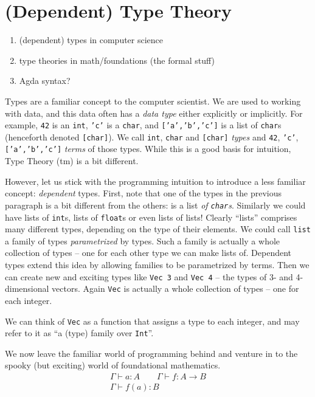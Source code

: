 \section{(Dependent) Type Theory}\label{sec/typetheory}
\begin{enumerate}
  \item (dependent) types in computer science
  \item type theories in math/foundations (the formal stuff)
  \item Agda syntax?
\end{enumerate}

Types are a familiar concept to the computer scientist. We are used to working
with data, and this data often has a \emph{data type} either explicitly or
implicitly. For example, \texttt{42} is an \texttt{int}, \texttt{'c'} is a
\texttt{char}, and \texttt{['a','b','c']} is a list of \texttt{char}s (henceforth
denoted \texttt{[char]}). We call
\texttt{int}, \texttt{char} and \texttt{[char]} \emph{types} and
\texttt{42}, \texttt{'c'}, \texttt{['a','b','c']} \emph{terms} of those types.
While this is a good basis for intuition, Type Theory (tm) is a bit different.

However, let us stick with the programming intuition to introduce a less
familiar concept: \emph{dependent} types. First, note that one of the types in
the previous paragraph is a bit different from the others: \text{['a','b','c']} is a
list \emph{of \texttt{char}s}. Similarly we could have lists of \texttt{int}s,
lists of \texttt{float}s or even lists of lists! Clearly ``lists'' comprises
many different types, depending on the type of their elements. We could call
\texttt{list} a family of types \emph{parametrized} by types. Such a family is
actually a whole collection of types -- one for each other type we can make
lists of.
Dependent types extend this idea by allowing families to be parametrized by
terms. Then we can create new and exciting types like \texttt{Vec 3} and
\texttt{Vec 4} -- the types of 3- and 4-dimensional vectors. Again \texttt{Vec} is
actually a whole collection of types -- one for each integer.

We can think of \texttt{Vec} as a function that assigns a type to each integer,
and may refer to it as ``a (type) family over \texttt{Int}''.

We now leave the familiar world of programming behind and venture in to the spooky
(but exciting) world of foundational mathematics.
\begin{equation}
  \begin{array}{c}
    \Gamma \vdash a : A \qquad \Gamma \vdash f : A \rightarrow B\\
    \hline
    \Gamma \vdash f(a) : B
  \end{array}
  \label{rule:example}
\end{equation}

